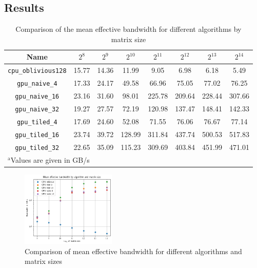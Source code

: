 \documentclass[conference]{IEEEtran}
\begin{document}
    \subsection{Results}
    \begin{table}[htbp]
        \caption{Comparison of the mean effective bandwidth for different algorithms by matrix size}
        \begin{center}
            \begin{tabular}{ | c | c | c | c | c | c | c | c |}
                \hline  
                Name                    & $2^8$    & $2^9$    & $2^{10}$  & $2^{11}$    & $2^{12}$  & $2^{13}$ & $2^{14}$ \\
                \hline  
                \texttt{cpu\_oblivious128}& 15.77  & 14.36  & 11.99  & 9.05  & 6.98 & 6.18 & 5.49\\ 
                \hline  
                \texttt{gpu\_naive\_4}& 17.33  & 24.17  & 49.58 & 66.96   & 75.05 & 77.02 & 76.25 \\      
                \hline  
                \texttt{gpu\_naive\_16}& 23.16  & 31.60  & 98.01 & 225.78   & 209.64 & 228.44 & 307.66 \\      
                \hline  
                \texttt{gpu\_naive\_32}& 19.27  & 27.57  & 72.19 & 120.98   & 137.47 & 148.41 & 142.33 \\      
                \hline  
                \texttt{gpu\_tiled\_4}& 17.69  & 24.60  & 52.08 & 71.55   & 76.06 & 76.67 & 77.14\\      
                \hline  
                \texttt{gpu\_tiled\_16}& 23.74  & 39.72  & 128.99 & 311.84   & 437.74 & 500.53 & 517.83\\      
                \hline  
                \texttt{gpu\_tiled\_32}& 22.65  & 35.09  & 115.23 & 309.69   & 403.84 & 451.99 & 471.01\\      
                \hline  
            \multicolumn{4}{l}{$^{\mathrm{a}}$Values are given in GB/s}     
            \end{tabular}       
        \end{center}
        \label{tab:gpu_bandwidth}
    \end{table}
    \begin{figure}[htbp]
        \centering
        \includegraphics[width=0.4\textwidth]{./images/gpu_bandwidth.png}
        \caption{Comparison of mean effective bandwidth for different algorithms and matrix sizes}
        \label{fig:gpu_bandwidth}  
    \end{figure}
\end{document}
